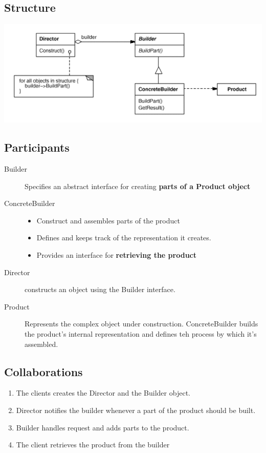 \documentclass[11pt, a4paper]{book}
\begin{document}
\subsection{Structure}
\includegraphics[width=\textwidth]{Builder_stru}
\subsection{Participants}
\begin{description}
    \item [Builder] Specifies an abstract interface for creating \textbf{parts
    of a Product object}
    \item[ConcreteBuilder]
        \begin{itemize}
        \item Construct and assembles parts of the product
        \item Defines and keeps track of the representation it creates.
        \item Provides an interface for \textbf{retrieving the product}
        \end{itemize}
    \item [Director] constructs an object using the Builder interface.
    \item [Product] Represents the complex object under construction.
    ConcreteBuilder builds the product's internal representation and defines teh
    process by which it's assembled.
\end{description}
\subsection{Collaborations}
\begin{enumerate}
\item The clients creates the Director and the Builder object.
\item Director notifies the builder whenever a part of the product should be
built.
\item Builder handles request and adds parts to the product.
\item The client retrieves the product from the builder
\end{enumerate}
\end{document}
